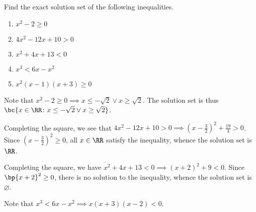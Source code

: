 \begin{problem}
    Find the exact solution set of the following inequalities.

    \begin{enumerate}
        \item $x^2 - 2 \geq 0$
        \item $4x^2 - 12x + 10 > 0$
        \item $x^2 + 4x + 13 < 0$
        \item $x^3 < 6x - x^2$
        \item $x^2(x-1)(x+3) \geq 0$
    \end{enumerate}
\end{problem}
\begin{solution}
    \begin{ppart}
        Note that $x^2 - 2 \geq 0 \implies x \leq -\sqrt{2} \lor x \geq \sqrt{2}$. The solution set is thus $\bc{x \in \RR \colon x \leq -\sqrt2 \lor x \geq \sqrt2}$.
    \end{ppart}
    \begin{ppart}
        Completing the square, we see that $4x^2 - 12x + 10 > 0 \implies (x-\frac32)^2 + \frac{19}4 > 0$. Since $(x-\frac32)^2 \geq 0$, all $x \in \RR$ satisfy the inequality, whence the solution set is $\RR$.
    \end{ppart}
    \begin{ppart}
        Completing the square, we have $x^2 + 4x + 13 < 0 \implies (x+2)^2 + 9 < 0$. Since $\bp{x+2}^2 \geq 0$, there is no solution to the inequality, whence the solution set is $\varnothing$.
    \end{ppart}
    \begin{ppart}
        Note that $x^3 < 6x - x^2 \implies x(x+3)(x-2) < 0$.
        \begin{center}
\end{center}
\end{ppart}
\end{solution}
